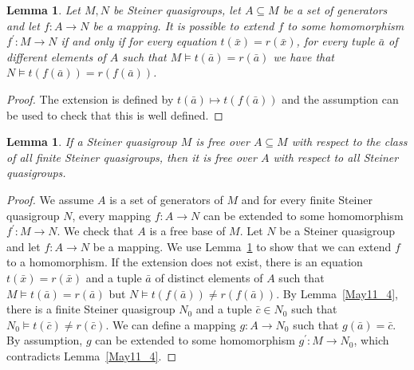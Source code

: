 \documentclass[a4paper, 11pt]{article}
\theoremstyle{note}
\newtheorem{lemma}[thm]{Lemma}
\begin{document}
	\begin{lemma}\label{May11_5} Let $M,N$ be Steiner quasigroups, let $A\subseteq M$ be a set of generators and let $f:A\rightarrow N$ be a mapping. It is possible to extend $f$ to some homomorphism $f^\prime: M\rightarrow N$  if and only if for every equation $t(\bar{x})= r(\bar{x})$, for every tuple $\bar{a}$ of different elements of $A$ such that $M\models t(\bar{a})= r(\bar{a})$ we have that $N\models t(f(\bar{a}))= r(f(\bar{a}))$.
	\end{lemma}
	\begin{proof} The extension is defined by  $t(\bar{a})\mapsto t(f(\bar{a}))$ and the assumption can be used to check that this is well defined.
	\end{proof}
	
	\begin{lemma}\label{May11_6} If a Steiner quasigroup $M$ is free over $A\subseteq M$ with respect to the class of all finite Steiner quasigroups, then it is free over $A$ with respect to all Steiner quasigroups.
	\end{lemma}
	\begin{proof} We assume $A$ is a set of generators of $M$ and for every finite Steiner quasigroup $N$, every mapping $f:A\rightarrow N$  can be extended to some homomorphism $f^\prime: M\rightarrow N$. We check that $A$ is a free base of $M$. Let $N$ be a Steiner quasigroup and let $f:A\rightarrow N$ be a mapping.  We use  Lemma~\ref{May11_5} to show that we can extend $f$ to a homomorphism. If the extension does not exist, there is an equation $t(\bar{x})= r(\bar{x})$ and a tuple $\bar{a}$ of distinct elements of $A$ such that $M\models t(\bar{a})= r(\bar{a})$ but $N\models t(f(\bar{a}))\neq r(f(\bar{a}))$. By Lemma~\ref{May11_4}, there is a finite Steiner quasigroup $N_0$ and a tuple $\bar{c}\in N_0$ such that  $N_0\models t(\bar{c})\neq r(\bar{c})$.  We can define a mapping $g:A\rightarrow N_0$  such that $g(\bar{a})= \bar{c}$. By assumption, $g$ can be extended to some homomorphism $g^\prime:M\rightarrow N_0$, which contradicts Lemma~\ref{May11_4}.
	\end{proof}
	
\end{document}

